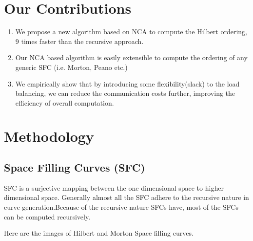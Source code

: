 \documentclass[a0,landscape]{a0poster}
\begin{document}
\begin{multicols}{4}





\color{ForestGreen}

\section*{Our Contributions}

\begin{enumerate}
\item We propose a new algorithm based on NCA to compute the Hilbert ordering, 9 times faster than the recursive approach.
\item Our NCA based algorithm is easily extensible to compute the ordering of any generic SFC (i.e. Morton, Peano etc.)
\item We empirically show that by introducing some flexibility(slack) to the load balancing, we can reduce the communication costs further, improving the efficiency of
overall computation. 
\end{enumerate}

\color{DarkSlateGray} %
\section*{Methodology}

\subsection*{Space Filling Curves (SFC)}
SFC is a surjective mapping between the one dimensional space to higher dimensional space. Generally almost all the SFC adhere to the recursive nature in curve generation.Because of the recursive
nature SFCs have, most of the SFCs can be computed recursively.

Here are the images of Hilbert and Morton Space filling curves. 



\end{multicols}
\end{document}
